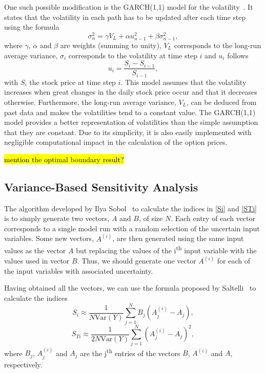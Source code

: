 \documentclass[a4paper,twocolumn,aps,prd,longbibliography,superscriptaddress]{revtex4-1}
\begin{document}
One such possible modification is the GARCH(1,1) model for the volatility~\citep{Hull}.
It states that the volatility in each path has to be updated after each time step using the formula
\begin{equation}
\sigma_n^2=\gamma V_L+\alpha u_{n-1}^2+\beta\sigma_{n-1}^2,
\end{equation}
\noindent where $\gamma$, $\alpha$ and $\beta$ are weights (summing to unity), $V_L$ corresponds to the long-run average variance, $\sigma_i$ corresponds to the volatility at time step $i$ and $u_i$ follows
\begin{equation}
u_i=\frac{S_i-S_{i-1}}{S_{i-1}},
\end{equation}
\noindent with $S_i$ the stock price at time step $i$.
This model assumes that the volatility increases when great changes in the daily stock price occur and that it decreases otherwise. Furthermore, the long-run average variance, $V_L$, can be deduced from past data and makes the volatilities tend to a constant value.
The GARCH(1,1) model provides a better representation of volatilities than the simple assumption that they are constant. Due to its simplicity, it is also easily implemented with negligible computational impact in the calculation of the option prices.

\hl{mention the optimal boundary result?}

\subsection{Variance-Based Sensitivity Analysis}
The algorithm developed by Ilya Sobol~\cite{Sobol} to calculate the indices in \ref{Si} and \ref{STi} is to simply generate two vectors, $A$ and $B$, of size $N$. Each entry of each vector corresponds to a single model run with a random selection of the uncertain input variables.
Some new vectors, $A^{(i)}$, are then generated using the same input values as the vector $A$ but replacing the values of the i\textsuperscript{th} input variable with the values used in vector $B$. Thus, we should generate one vector $A^{(i)}$ for each of the input variables with associated uncertainty.

Having obtained all the vectors, we can use the formula proposed by Saltelli~\citep{Saltelli} to calculate the indices
\begin{equation}\label{Si2}
S_i\approx\frac{1}{N\mathrm{Var}(Y)}\sum_{j=1}^NB_j\left(A^{(i)}_j-A_j\right),
\end{equation}
\begin{equation}\label{STi2}
S_{Ti}\approx\frac{1}{2N\mathrm{Var}(Y)}\sum_{j=1}^N\left(A^{(i)}_j-A_j\right)^2,
\end{equation}
\noindent where $B_j$, $A^{(i)}_j$ and $A_j$ are the j\textsuperscript{th} entries of the vectors $B$, $A^{(i)}$ and $A$, respectively.
\end{document}
